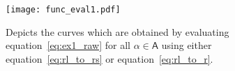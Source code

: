 \documentclass[twoside,reqno,11pt]{fcaa-var} %
\begin{document}

\begin{figure}[htb]
\centering
\texttt{[image: func\_eval1.pdf]}
\caption{Depicts the curves which are obtained by evaluating equation~\eqref{eq:ex1_raw} for all $\alpha\in \mathsf{A}$ using either equation~\eqref{eq:rl_to_rs} or equation~\eqref{eq:rl_to_r}.}
\label{fig:eval1}
\end{figure}
\end{document}
